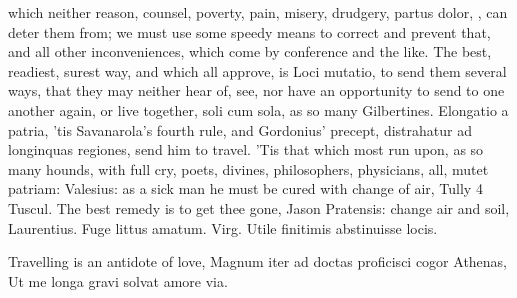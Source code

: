 which neither reason, counsel, poverty, pain, misery, drudgery, partus
dolor, \etc{}, can deter them from; we must use some speedy means to
correct and prevent that, and all other inconveniences, which come by
conference and the like. The best, readiest, surest way, and which all
approve, is Loci mutatio, to send them several ways, that they may
neither hear of, see, nor have an opportunity to send to one another
again, or live together, soli cum sola, as so many Gilbertines.
Elongatio a patria, 'tis Savanarola's fourth rule, and Gordonius'
precept, distrahatur ad longinquas regiones, send him to travel. 'Tis
that which most run upon, as so many hounds, with full cry, poets,
divines, philosophers, physicians, all, mutet patriam: Valesius:
as a sick man he must be cured with change of air, Tully 4
Tuscul. The best remedy is to get thee gone, Jason Pratensis: change
air and soil, Laurentius. Fuge littus amatum.
Virg. Utile finitimis abstinuisse locis.

Travelling is an antidote of love,
Magnum iter ad doctas proficisci cogor Athenas,
Ut me longa gravi solvat amore via.

